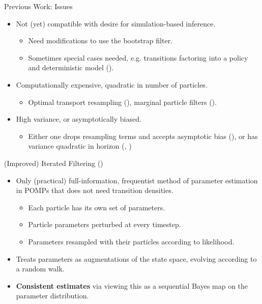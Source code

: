 \documentclass{beamer}
\begin{document}
\begin{frame}{Previous Work: Issues}
    \begin{itemize}
        \item Not (yet) compatible with desire for simulation-based inference.
        \begin{itemize}
            \item \pause Need modifications to use the bootstrap filter.
            \item \pause Sometimes special cases needed, e.g. transitions factoring into a policy and deterministic model (\cite{singh22}).
        \end{itemize}
        \item \pause Computationally expensive, quadratic in number of particles.
        \begin{itemize}
            \item \pause Optimal transport resampling (\cite{corenflos21}), marginal particle filters (\cite{scibior21}).
        \end{itemize}
        \item \pause High variance, or asymptotically biased.
        \begin{itemize}
            \item \pause Either one drops resampling terms and accepts asymptotic bias (\cite{blei2018vsmc}), or has variance quadratic in horizon (\cite{poyiadjis11}, \cite{scibior21})
        \end{itemize}
    \end{itemize}
\end{frame}

\begin{frame}{(Improved) Iterated Filtering (\cite{ionides15})}
    \begin{itemize}
        \item Only (practical) full-information, frequentist method of parameter estimation in POMPs that does not need transition densities. 
        \begin{itemize}
            \item \pause Each particle has its own set of parameters.
            \item \pause Particle parameters perturbed at every timestep.
            \item \pause Parameters resampled with their particles according to likelihood.
        \end{itemize}
        \item \pause Treats parameters as augmentations of the state space, evolving according to a random walk.
        \item \pause \textbf{Consistent estimates} via viewing this as a sequential Bayes map on the parameter distribution.
    \end{itemize}
\end{frame}
\end{document}
